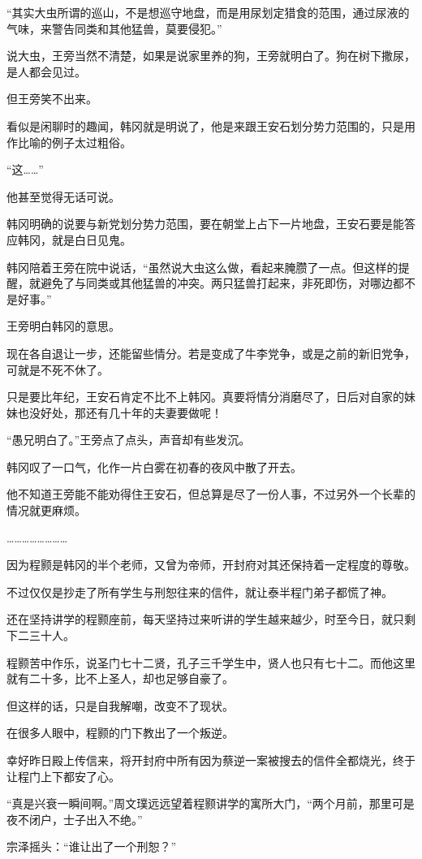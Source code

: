“其实大虫所谓的巡山，不是想巡守地盘，而是用尿划定猎食的范围，通过尿液的气味，来警告同类和其他猛兽，莫要侵犯。”

说大虫，王旁当然不清楚，如果是说家里养的狗，王旁就明白了。狗在树下撒尿，是人都会见过。

但王旁笑不出来。

看似是闲聊时的趣闻，韩冈就是明说了，他是来跟王安石划分势力范围的，只是用作比喻的例子太过粗俗。

“这……”

他甚至觉得无话可说。

韩冈明确的说要与新党划分势力范围，要在朝堂上占下一片地盘，王安石要是能答应韩冈，就是白日见鬼。

韩冈陪着王旁在院中说话，“虽然说大虫这么做，看起来腌臜了一点。但这样的提醒，就避免了与同类或其他猛兽的冲突。两只猛兽打起来，非死即伤，对哪边都不是好事。”

王旁明白韩冈的意思。

现在各自退让一步，还能留些情分。若是变成了牛李党争，或是之前的新旧党争，可就是不死不休了。

只是要比年纪，王安石肯定不比不上韩冈。真要将情分消磨尽了，日后对自家的妹妹也没好处，那还有几十年的夫妻要做呢！

“愚兄明白了。”王旁点了点头，声音却有些发沉。

韩冈叹了一口气，化作一片白雾在初春的夜风中散了开去。

他不知道王旁能不能劝得住王安石，但总算是尽了一份人事，不过另外一个长辈的情况就更麻烦。

……………………

因为程颢是韩冈的半个老师，又曾为帝师，开封府对其还保持着一定程度的尊敬。

不过仅仅是抄走了所有学生与刑恕往来的信件，就让泰半程门弟子都慌了神。

还在坚持讲学的程颢座前，每天坚持过来听讲的学生越来越少，时至今日，就只剩下二三十人。

程颢苦中作乐，说圣门七十二贤，孔子三千学生中，贤人也只有七十二。而他这里就有二十多，比不上圣人，却也足够自豪了。

但这样的话，只是自我解嘲，改变不了现状。

在很多人眼中，程颢的门下教出了一个叛逆。

幸好昨日殿上传信来，将开封府中所有因为蔡逆一案被搜去的信件全都烧光，终于让程门上下都安了心。

“真是兴衰一瞬间啊。”周文璞远远望着程颢讲学的寓所大门，“两个月前，那里可是夜不闭户，士子出入不绝。”

宗泽摇头：“谁让出了一个刑恕？”

